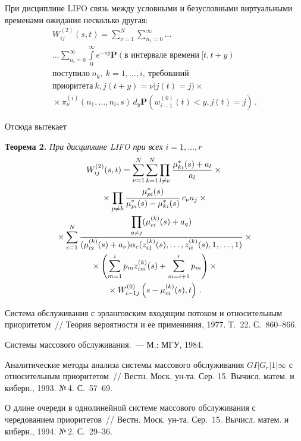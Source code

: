 \begin{multicols}{2}
При дисциплине LIFO связь между условными и безусловными виртуальными временами 
ожидания несколько другая:
\begin{multline*}
W_{ij}^{(2)}(s,t)=\sum\limits_{\nu=1}^N\sum\limits_{n_1=0}^{\infty}\ldots{}\\[3pt]
{}\ldots\sum\limits_{n_i=0}^{\infty}\int\limits_0^{\infty}
e^{-sy}\mathbf{P}(\mbox{в интервале времени}\ [t,t+y)\\[3pt]
 \mbox{поступило}\ n_k,\:k=1,\ldots,i,\ \mbox{требований}\\[3pt]
 \mbox{приоритета}\ k,  j(t+y)=\nu|j(t)=j)\times{}\\[3pt]
 {}\times\pi_{\nu}^{(i)}\left(n_1,\ldots,n_i,s\right)\,d_y
 \mathbf{P}(w_{i-1}^{(0)}(t)<y,j(t)=j)\,.
\end{multline*}

Отсюда вытекает

\medskip

\noindent
\textbf{Теорема 2.} \textit{При дисциплине LIFO при всех $i=1,\ldots,r$}
\begin{multline*}
W_{ij}^{(2)}(s,t)=\sum\limits_{\nu=1}^N\sum\limits_{k=1}^N
\prod_{l\ne \nu}\displaystyle\frac{\displaystyle \mu_{ki}^{*}(s)+a_l\mathstrut}{\displaystyle a_l\mathstrut}\times{}\\
{}\times
\prod_{p\ne k}\displaystyle\frac{\displaystyle \mu_{pi}^{*}(s)\mathstrut}{\displaystyle \mu_{pi}^{*}(s)-\mu_{ki}^{*}(s)\mathstrut}\,c_{\nu}a_j\times{}\\
{}\times
\sum\limits_{c=1}^N\displaystyle\frac{\displaystyle \prod\limits_{q\ne j}(\mu_{ci}^{(k)}(s)+a_q)\mathstrut}{\displaystyle (\mu_{ci}^{(k)}(s)+a_{\nu})\alpha_c(z_{i1}^{(k)}(s),\ldots,z_{ii}^{(k)}(s),1,\ldots,1)\mathstrut}\times{}\\
{}\times 
\left(\sum\limits_{m=1}^i p_mz_{im}^{(k)}(s)+\sum\limits_{m=i+1}^r p_m\right)\times{}\\
{}\times W_{i-1j}^{(0)}
\left(s-\mu_{ci}^{(k)}(s),t\right)\,.
\end{multline*}

{\small\frenchspacing
{%
\begin{thebibliography}{9}

 Система обслуживания с эрланговским входящим
потоком и относительным приоритетом~// Теория вероятности и ее примениния,
1977. Т.~22. С.~860--866.

 Системы массового обслуживания.~--- М.: МГУ, 1984.

 Аналитические методы анализа системы массового
обслуживания $GI|G_r|1|\infty$ с относительным приоритетом~// Вестн.
Моск. ун-та. Сер. 15. Вычисл. матем. и киберн., 1993. №\,4.
С.~57--69.

\label{end\stat}

  О длине очереди в однолинейной системе
массового обслуживания с чередованием приоритетов~// Вестн. Моск.
ун-та. Сер.~15. Вычисл. матем. и киберн., 1994. №\,2. С.~29--36.
 \end{thebibliography}
}
}


\end{multicols}       